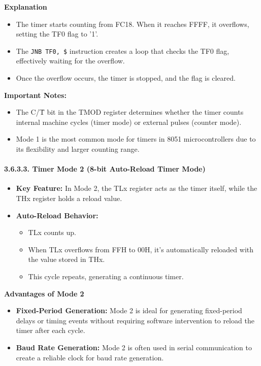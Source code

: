 \documentclass[
]{article}
\begin{document}
\textbf{Explanation}

\begin{itemize}
\item
  The timer starts counting from FC18. When it reaches FFFF, it
  overflows, setting the TF0 flag to '1'.
\item
  The \texttt{JNB\ TF0,\ \$} instruction creates a loop that checks the
  TF0 flag, effectively waiting for the overflow.
\item
  Once the overflow occurs, the timer is stopped, and the flag is
  cleared.
\end{itemize}

\textbf{Important Notes:}

\begin{itemize}
\item
  The C/T̄ bit in the TMOD register determines whether the timer counts
  internal machine cycles (timer mode) or external pulses (counter
  mode).
\item
  Mode 1 is the most common mode for timers in 8051 microcontrollers due
  to its flexibility and larger counting range.
\end{itemize}

\hypertarget{3633-timer-mode-2-8-bit-auto-reload-timer-mode}{%
\paragraph{3.6.3.3. Timer Mode 2 (8-bit Auto-Reload Timer
Mode)}\label{3633-timer-mode-2-8-bit-auto-reload-timer-mode}}

\begin{itemize}
\item
  \textbf{Key Feature:} In Mode 2, the TLx register acts as the timer
  itself, while the THx register holds a reload value.
\item
  \textbf{Auto-Reload Behavior:}

  \begin{itemize}
  \item
    TLx counts up.
  \item
    When TLx overflows from FFH to 00H, it's automatically reloaded with
    the value stored in THx.
  \item
    This cycle repeats, generating a continuous timer.
  \end{itemize}
\end{itemize}

\textbf{Advantages of Mode 2}

\begin{itemize}
\item
  \textbf{Fixed-Period Generation:} Mode 2 is ideal for generating
  fixed-period delays or timing events without requiring software
  intervention to reload the timer after each cycle.
\item
  \textbf{Baud Rate Generation:} Mode 2 is often used in serial
  communication to create a reliable clock for baud rate generation.
\end{itemize}
\end{document}
